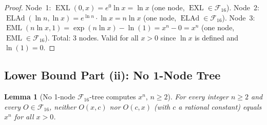 \documentclass[12pt,a4paper]{article}
\newtheorem{lemma}[theorem]{Lemma}
\theoremstyle{definition}
\newcommand{\EML}{\operatorname{EML}}
\newcommand{\EXL}{\operatorname{EXL}}
\newcommand{\ELAd}{\operatorname{ELAd}}
\newcommand{\F}{\mathcal{F}_{16}}
\begin{document}
\begin{proof}
Node~1: $\EXL(0,x)=e^0\ln x=\ln x$ (one node, $\EXL\in\F$).
Node~2: $\ELAd(\ln n, \ln x) = e^{\ln n}\cdot\ln x = n\ln x$ (one node, $\ELAd\in\F$).
Node~3: $\EML(n\ln x, 1) = \exp(n\ln x) - \ln(1) = x^n - 0 = x^n$ (one node, $\EML\in\F$).
Total: 3 nodes.  Valid for all $x>0$ since $\ln x$ is defined and $\ln(1)=0$.
\end{proof}

\subsection{Lower Bound Part (ii): No 1-Node Tree}

\begin{lemma}[No 1-node $\F$-tree computes $x^n$, $n\geq 2$]\label{lem:pow-1node}
For every integer $n\geq 2$ and every $O\in\F$, neither $O(x,c)$ nor $O(c,x)$
(with $c$ a rational constant) equals $x^n$ for all $x>0$.
\end{lemma}
\end{document}
